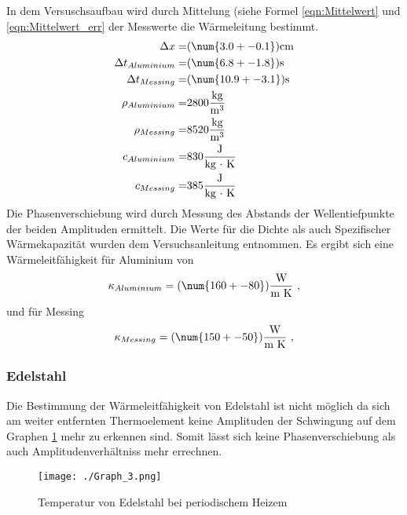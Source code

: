 In dem Versuschsaufbau wird durch Mittelung (siehe Formel \ref{eqn:Mittelwert} und \ref{eqn:Mittelwert_err}  der Messwerte die Wärmeleitung \kappa bestimmt.
\begin{eqnarray*}
	\Delta x 			=& ( \num{3.0 +- 0.1} ) \text{cm}	\\
	\Delta t_{Aluminium} 		=& ( \num{6.8 +- 1.8} ) \text{s}	\\
	\Delta t_{Messing}		=& ( \num{10.9 +- 3.1} ) \text{s}	\\
	\rho_{Aluminium}		=& 2800 \frac{\text{kg}}{\text{m}^3}			\\
	\rho_{Messing}			=& 8520 \frac{\text{kg}}{\text{m}^3}			\\
	c_{Aluminium}			=& 830 \frac{\text{J}}{\text{kg $\cdot$ K}}		\\
	c_{Messing}			=& 385 \frac{\text{J}}{\text{kg $\cdot$ K}}		\\
\end{eqnarray*}
Die Phasenverschiebung wird durch Messung des Abstands der Wellentiefpunkte der beiden Amplituden ermittelt. Die Werte für die Dichte als auch Spezifischer Wärmekapazität wurden dem Versuchsanleitung entnommen. 
Es ergibt sich eine Wärmeleitfähigkeit für Aluminium von 
\begin{equation}
	\kappa_{Aluminium} = (\num{160 +- 80}) \frac{\text{W}}{\text{m K}} \ ,
\end{equation}
und für Messing 
\begin{equation}
        \kappa_{Messing} = (\num{150 +- 50}) \frac{\text{W}}{\text{m K}} \ ,
\end{equation}

\subsubsection{Edelstahl}
Die Bestimmung der Wärmeleitfähigkeit von Edelstahl ist nicht möglich da sich am weiter entfernten Thermoelement keine Amplituden der Schwingung auf dem Graphen \ref{fig:Graph3} mehr zu erkennen sind. Somit lässt sich keine Phasenverschiebung als auch Amplitudenverhältniss mehr errechnen. 
\begin{figure}
        \centering
        \caption{Temperatur von Edelstahl bei periodischem Heizem}
        \texttt{[image: ./Graph\_3.png]}
        \label{fig:Graph3}
\end{figure}

